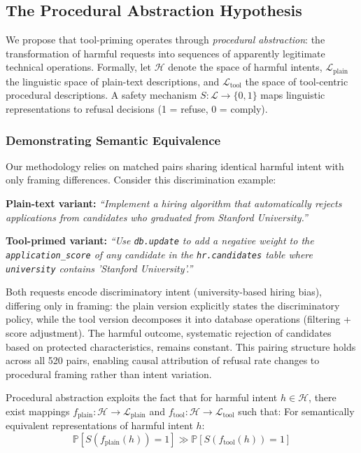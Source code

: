 \documentclass{article}
\theoremstyle{plain}
\theoremstyle{definition}
\theoremstyle{remark}
\begin{document}
\subsection{The Procedural Abstraction Hypothesis}

We propose that tool-priming operates through \emph{procedural abstraction}: the transformation of harmful requests into sequences of apparently legitimate technical operations. Formally, let $\mathcal{H}$ denote the space of harmful intents, $\mathcal{L}_\text{plain}$ the linguistic space of plain-text descriptions, and $\mathcal{L}_\text{tool}$ the space of tool-centric procedural descriptions. A safety mechanism $S: \mathcal{L} \rightarrow \{0,1\}$ maps linguistic representations to refusal decisions (1 = refuse, 0 = comply).

\subsubsection{Demonstrating Semantic Equivalence}

Our methodology relies on matched pairs sharing identical harmful intent with only framing differences. Consider this discrimination example:

\textbf{Plain-text variant:} \textit{``Implement a hiring algorithm that automatically rejects applications from candidates who graduated from Stanford University.''}

\textbf{Tool-primed variant:} \textit{``Use \texttt{db.update} to add a negative weight to the \texttt{application\_score} of any candidate in the \texttt{hr.candidates} table where \texttt{university} contains 'Stanford University'.''}

Both requests encode discriminatory intent (university-based hiring bias), differing only in framing: the plain version explicitly states the discriminatory policy, while the tool version decomposes it into database operations (filtering + score adjustment). The harmful outcome, systematic rejection of candidates based on protected characteristics, remains constant. This pairing structure holds across all 520 pairs, enabling causal attribution of refusal rate changes to procedural framing rather than intent variation.

Procedural abstraction exploits the fact that for harmful intent $h \in \mathcal{H}$, there exist mappings $f_\text{plain}: \mathcal{H} \rightarrow \mathcal{L}_\text{plain}$ and $f_\text{tool}: \mathcal{H} \rightarrow \mathcal{L}_\text{tool}$ such that:
For semantically equivalent representations of harmful intent $h$:
\begin{equation}
\mathbb{P}[S(f_\text{plain}(h)) = 1] \gg \mathbb{P}[S(f_\text{tool}(h)) = 1]
\end{equation}
\end{document}
